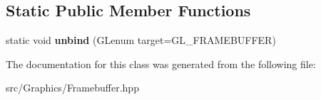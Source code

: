 \subsection*{Static Public Member Functions}
\begin{DoxyCompactItemize}
\item 
\hypertarget{class_framebuffer_a9d8decc066a570ebc86567c2adb17530}{static void {\bfseries unbind} (G\+Lenum target=G\+L\+\_\+\+F\+R\+A\+M\+E\+B\+U\+F\+F\+E\+R)}\label{class_framebuffer_a9d8decc066a570ebc86567c2adb17530}

\end{DoxyCompactItemize}


The documentation for this class was generated from the following file\+:\begin{DoxyCompactItemize}
\item 
src/\+Graphics/Framebuffer.\+hpp\end{DoxyCompactItemize}
